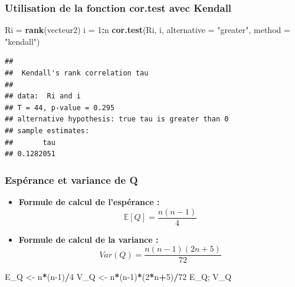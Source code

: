 \documentclass[
  12pt,
]{article}
\newenvironment{Shaded}{\begin{snugshade}}{\end{snugshade}}
\newcommand{\AttributeTok}[1]{\textcolor[rgb]{0.13,0.29,0.53}{#1}}
\newcommand{\DecValTok}[1]{\textcolor[rgb]{0.00,0.00,0.81}{#1}}
\newcommand{\FunctionTok}[1]{\textcolor[rgb]{0.13,0.29,0.53}{\textbf{#1}}}
\newcommand{\NormalTok}[1]{#1}
\newcommand{\OtherTok}[1]{\textcolor[rgb]{0.56,0.35,0.01}{#1}}
\newcommand{\SpecialCharTok}[1]{\textcolor[rgb]{0.81,0.36,0.00}{\textbf{#1}}}
\newcommand{\StringTok}[1]{\textcolor[rgb]{0.31,0.60,0.02}{#1}}
\begin{document}
\subsubsection{Utilisation de la fonction cor.test avec
Kendall}\label{utilisation-de-la-fonction-cor.test-avec-kendall}

\begin{Shaded}
\begin{Highlighting}[]
\NormalTok{Ri }\OtherTok{=} \FunctionTok{rank}\NormalTok{(vecteur2)}
\NormalTok{i }\OtherTok{=} \DecValTok{1}\SpecialCharTok{:}\NormalTok{n}
\FunctionTok{cor.test}\NormalTok{(Ri, i, }\AttributeTok{alternative =} \StringTok{"greater"}\NormalTok{, }\AttributeTok{method =} \StringTok{"kendall"}\NormalTok{)}
\end{Highlighting}
\end{Shaded}

\begin{verbatim}
## 
##  Kendall's rank correlation tau
## 
## data:  Ri and i
## T = 44, p-value = 0.295
## alternative hypothesis: true tau is greater than 0
## sample estimates:
##       tau 
## 0.1282051
\end{verbatim}

\subsubsection{Espérance et variance de
Q}\label{espuxe9rance-et-variance-de-q}

\begin{itemize}
\item
  \textbf{Formule de calcul de l'espérance :}
  \[ \mathbb{E}[Q]= \dfrac{n(n−1)}{4}\]
\item
  \textbf{Formule de calcul de la variance :}
  \[Var(Q)= \dfrac{n(n−1)(2n+5)}{72}\]
\end{itemize}

\begin{Shaded}
\begin{Highlighting}[]
\NormalTok{E\_Q }\OtherTok{\textless{}{-}}\NormalTok{ n}\SpecialCharTok{*}\NormalTok{(n}\DecValTok{{-}1}\NormalTok{)}\SpecialCharTok{/}\DecValTok{4}
\NormalTok{V\_Q }\OtherTok{\textless{}{-}}\NormalTok{ n}\SpecialCharTok{*}\NormalTok{(n}\DecValTok{{-}1}\NormalTok{)}\SpecialCharTok{*}\NormalTok{(}\DecValTok{2}\SpecialCharTok{*}\NormalTok{n}\SpecialCharTok{+}\DecValTok{5}\NormalTok{)}\SpecialCharTok{/}\DecValTok{72}
\NormalTok{E\_Q; V\_Q}
\end{Highlighting}
\end{Shaded}
\end{document}
